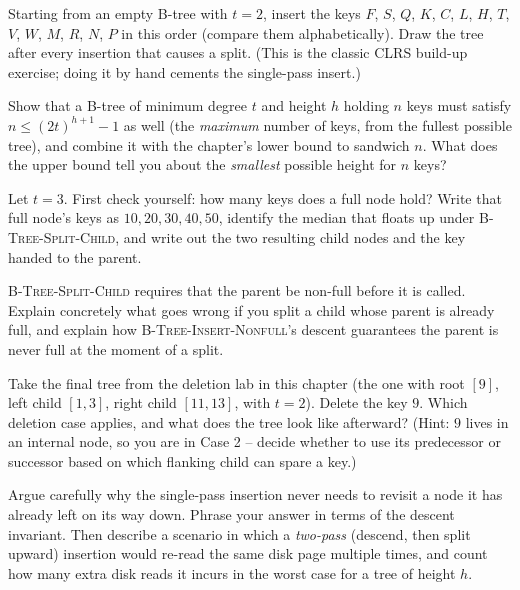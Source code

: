 \begin{exercise}\label{ch18:ex-build}
Starting from an empty B-tree with $t = 2$, insert the keys
$F$, $S$, $Q$, $K$, $C$, $L$, $H$, $T$, $V$, $W$, $M$, $R$, $N$, $P$ in this
order (compare them alphabetically). Draw the tree after every insertion that causes a split. (This is
the classic CLRS build-up exercise; doing it by hand cements the single-pass
insert.)
\end{exercise}

\begin{exercise}\label{ch18:ex-minkeys}
Show that a B-tree of minimum degree $t$ and height $h$ holding $n$ keys must
satisfy $n \le (2t)^{h+1} - 1$ as well (the \emph{maximum} number of keys, from the
fullest possible tree), and combine it with the chapter's lower bound to sandwich
$n$. What does the upper bound tell you about the \emph{smallest} possible height
for $n$ keys?
\end{exercise}

\begin{exercise}\label{ch18:ex-split-trace}
Let $t = 3$. First check yourself: how many keys does a full node hold? Write that
full node's keys as $10, 20, 30, 40, 50$, identify the median that floats up under
\textsc{B-Tree-Split-Child}, and write out the two resulting child nodes and the key
handed to the parent.
\end{exercise}

\begin{exercise}\label{ch18:ex-why-not-full-parent}
\textsc{B-Tree-Split-Child} requires that the parent be non-full before it is
called. Explain concretely what goes wrong if you split a child whose parent is
already full, and explain how \textsc{B-Tree-Insert-Nonfull}'s descent guarantees
the parent is never full at the moment of a split.
\end{exercise}

\begin{exercise}\label{ch18:ex-delete-trace}
Take the final tree from the deletion lab in this chapter (the one with root $[9]$,
left child $[1,3]$, right child $[11,13]$, with $t=2$). Delete the key $9$. Which
deletion case applies, and what does the tree look like afterward? (Hint: $9$ lives
in an internal node, so you are in Case 2 -- decide whether to use its predecessor
or successor based on which flanking child can spare a key.)
\end{exercise}

\begin{exercise}\label{ch18:ex-onepass-vs-twopass}
Argue carefully why the single-pass insertion never needs to revisit a node it has
already left on its way down. Phrase your answer in terms of the descent invariant.
Then describe a scenario in which a \emph{two-pass} (descend, then split upward)
insertion would re-read the same disk page multiple times, and count how many extra
disk reads it incurs in the worst case for a tree of height $h$.
\end{exercise}

